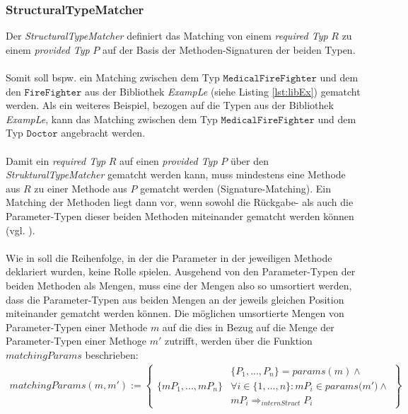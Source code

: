 \subsubsection{StructuralTypeMatcher} \label{subsec_structmatcher}
Der \emph{StructuralTypeMatcher} definiert das Matching von einem \emph{required Typ} $R$ zu einem \emph{provided Typ} $P$ auf der Basis der Methoden-Signaturen der beiden Typen.
\\\\
Somit soll bspw. ein Matching zwischen dem Typ $\texttt{MedicalFireFighter}$ und dem den $\texttt{FireFighter}$ aus der Bibliothek \emph{ExampLe}  (siehe Listing \ref{lst:libEx}) gematcht werden. Als ein weiteres Beispiel, bezogen auf die Typen aus der Bibliothek \emph{ExampLe}, kann das Matching zwischen dem Typ $\texttt{MedicalFireFighter}$ und dem Typ $\texttt{Doctor}$ angebracht werden.
\\\\
Damit ein \emph{required Typ} $R$ auf einen \emph{provided Typ} $P$ über den \emph{StrukturalTypeMatcher} gematcht werden kann, muss mindestens eine Methode aus $R$ zu einer Methode aus $P$ gematcht werden (Signature-Matching). Ein Matching der Methoden liegt dann vor, wenn sowohl die Rückgabe- als auch die Parameter-Typen dieser beiden Methoden miteinander gematcht werden können (vgl. \cite{moormann}). 
\\\\
Wie in \cite{moormann} soll die Reihenfolge, in der die Parameter in der jeweiligen Methode deklariert wurden, keine Rolle spielen. Ausgehend von den Parameter-Typen der beiden Methoden als Mengen, muss eine der Mengen also so umsortiert werden, dass die Parameter-Typen aus beiden Mengen an der jeweils gleichen Position miteinander gematcht werden können.
Die möglichen umsortierte Mengen von Parameter-Typen einer Methode $m$ auf die dies in Bezug auf die Menge der Parameter-Typen einer Methoge $m'$ zutrifft, werden über die Funktion $\mathit{matchingParams}$ beschrieben:
\begin{gather*}
\mathit{matchingParams(m, m')} :=
\left\{
\begin{array}{l|l}
	&
	\{\mathit{P_1,...,P_n}\} = \mathit{params(m)} \wedge \mathit{ }
	\\
	\{\mathit{mP_1,...,mP_n}\}
	&
	\forall i \in \{1,...,n\}: \mathit{mP_i} \in \mathit{params(m'}) \wedge \mathit{ }
	\\
	&
	\mathit{mP_i} \Rightarrow_{internStruct} \mathit{P_i}
\end{array}
\right\}
\end{gather*}
